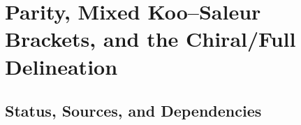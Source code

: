 
\section{Parity, Mixed Koo--Saleur Brackets, and the Chiral/Full Delineation}
\label{sec:parity-chiral-delineation}

\subsection{Status, Sources, and Dependencies}

